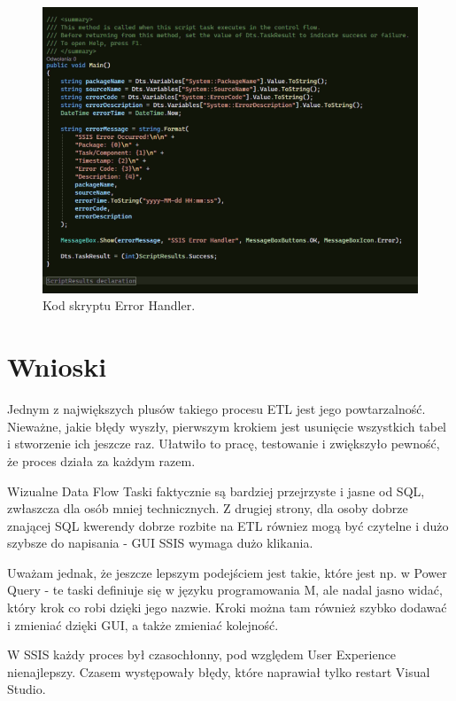 \documentclass[a4paper,12pt]{article}
\begin{document}
\begin{figure}[H]
    \centering
    \includegraphics[width=\textwidth]{images/5_error_handler_script.png}
    \caption{Kod skryptu Error Handler.}
\end{figure}

\section{Wnioski}

Jednym z największych plusów takiego procesu ETL jest jego powtarzalność. Nieważne, jakie błędy wyszły, pierwszym krokiem jest usunięcie wszystkich tabel i stworzenie ich jeszcze raz. Ułatwiło to pracę, testowanie i zwiększyło pewność, że proces działa za każdym razem.

Wizualne Data Flow Taski faktycznie są bardziej przejrzyste i jasne od SQL, zwłaszcza dla osób mniej technicznych. Z drugiej strony, dla osoby dobrze znającej SQL kwerendy dobrze rozbite na ETL równiez mogą być czytelne i dużo szybsze do napisania - GUI SSIS wymaga dużo klikania.

Uważam jednak, że jeszcze lepszym podejściem jest takie, które jest np. w Power Query - te taski definiuje się w języku programowania M, ale nadal jasno widać, który krok co robi dzięki jego nazwie. Kroki można tam również szybko dodawać i zmieniać dzięki GUI, a także zmieniać kolejność.

W SSIS każdy proces był czasochłonny, pod względem User Experience nienajlepszy. Czasem występowały błędy, które naprawiał tylko restart Visual Studio.
\end{document}
